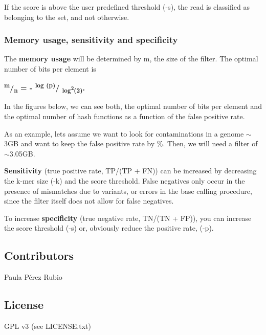 If the score is above the user predefined threshold ({\ttfamily -\/s}), the read is classified as belonging to the set, and not otherwise.

\subsubsection*{Memory usage, sensitivity and specificity}

The {\bfseries memory usage} will be determined by {\ttfamily m}, the size of the filter. The optimal number of bits per element is

{\bfseries  \textsuperscript{m}/\textsubscript{n} = -\/ \textsuperscript{ log (p)}/ \textsubscript{log\textsuperscript{2}(2)}. }

In the figures below, we can see both, the optimal number of bits per element and the optimal number of hash functions as a function of the false positive rate.

 

As an example, let\textquotesingle{}s assume we want to look for contaminations in a genome {\ttfamily $\sim$3\+GB} and want to keep the false positive rate by {\%}. Then, we will need a filter of {\ttfamily $\sim$3.05\+GB}.

{\bfseries Sensitivity} (true positive rate, T\+P/(TP + FN)) can be increased by decreasing the {\ttfamily k}-\/mer size ({\ttfamily -\/k}) and the score threshold. False negatives only occur in the presence of mismatches due to variants, or errors in the base calling procedure, since the filter itself does not allow for false negatives.

To increase {\bfseries specificity} (true negative rate, T\+N/(TN + FP)), you can increase the score threshold ({\ttfamily -\/s}) or, obviously reduce the positive rate, ({\ttfamily -\/p}).

\subsection*{Contributors}

Paula Pérez Rubio

\subsection*{License}

G\+PL v3 (see L\+I\+C\+E\+N\+S\+E.\+txt) 